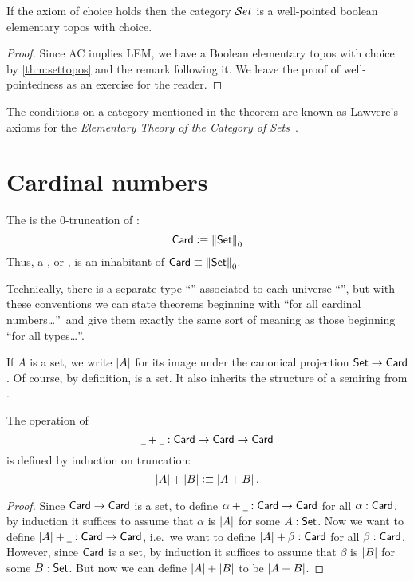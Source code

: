 \begin{thm}\label{thm:ETCS}
  If the axiom of choice holds then the category $\mathcal{S}et$ is a well-pointed boolean elementary topos with choice.  
\end{thm}

\begin{proof}
  Since AC implies LEM, we have a Boolean elementary topos with choice by \autoref{thm:settopos} and the remark following it.  We leave the proof of well-pointedness as
an exercise for the reader.
\end{proof}

\begin{rmk}
  The conditions on a category mentioned in the theorem are known as Lawvere's
  axioms for the \emph{Elementary Theory of the Category of
    Sets}~\cite{lawvere:etcs-long}.
\end{rmk}

\section{Cardinal numbers}
\label{sec:cardinals}

\begin{defn}
  The  is the 0-truncation of \set:
  \[ \mathsf{Card} \vcentcolon\equiv \mathopen{}\left\Vert \mathsf{Set}\right\Vert_{0}\mathclose{} \]
  Thus, a , or , is an inhabitant of $\mathsf{Card}\equiv \mathopen{}\left\Vert \mathsf{Set}\right\Vert_{0}\mathclose{}$.
\end{defn}

\begin{rmk}
  Technically, there is a separate type ``\card'' associated to each universe ``\type'', but with these conventions we can state theorems beginning with ``for all cardinal numbers\dots''\ and give them exactly the same sort of meaning as those beginning ``for all types\dots''.
\end{rmk}

If $A$ is a set, we write $\left|A\right|$ for its image under the canonical projection $\mathsf{Set} \to \mathsf{Card}$.
Of course, by definition, \card is a set.
It also inherits the structure of a semiring from \set.

\begin{defn}
  The operation of 
  \[ \mathord{\underline{\hspace{1ex}}}+\mathord{\underline{\hspace{1ex}}} : \mathsf{Card} \to \mathsf{Card} \to \mathsf{Card} \]
  is defined by induction on truncation:
  \[ \left|A\right| + \left|B\right| \vcentcolon\equiv \left|A+B\right| .\]
\end{defn}
\begin{proof}
  Since $\mathsf{Card}\to\mathsf{Card}$ is a set, to define $\alpha+\mathord{\underline{\hspace{1ex}}}:\mathsf{Card}\to\mathsf{Card}$ for all $\alpha:\mathsf{Card}$, by induction it suffices to assume that $\alpha$ is $\left|A\right|$ for some $A:\mathsf{Set}$.
  Now we want to define $\left|A\right|+\mathord{\underline{\hspace{1ex}}} :\mathsf{Card}\to\mathsf{Card}$, i.e.\ we want to define $\left|A\right|+\beta :\mathsf{Card}$ for all $\beta:\mathsf{Card}$.
  However, since $\mathsf{Card}$ is a set, by induction it suffices to assume that $\beta$ is $\left|B\right|$ for some $B:\mathsf{Set}$.
  But now we can define $\left|A\right|+\left|B\right|$ to be $\left|A+B\right|$.
\end{proof}

